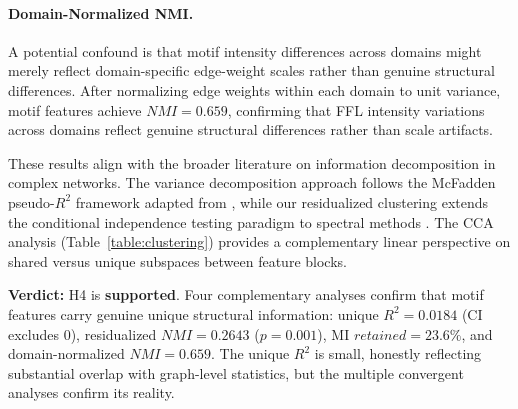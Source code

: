 \paragraph{Domain-Normalized NMI.}
A potential confound is that motif intensity differences across domains might merely reflect domain-specific edge-weight scales rather than genuine structural differences. After normalizing edge weights within each domain to unit variance, motif features achieve $NMI=0.659$, confirming that FFL intensity variations across domains reflect genuine structural differences rather than scale artifacts.

These results align with the broader literature on information decomposition in complex networks. The variance decomposition approach follows the McFadden pseudo-$R^2$ framework adapted from \citet{mcfadden1974conditional}, while our residualized clustering extends the conditional independence testing paradigm to spectral methods \cite{ng2002spectral}. The CCA analysis (Table~\ref{table:clustering}) provides a complementary linear perspective on shared versus unique subspaces between feature blocks.

\textbf{Verdict:} H4 is \textbf{supported}. Four complementary analyses confirm that motif features carry genuine unique structural information: unique $R^2=0.0184$ (CI excludes 0), residualized $NMI=0.2643$ ($p=0.001$), MI $retained=23.6\%$, and domain-normalized $NMI=0.659$. The unique $R^2$ is small, honestly reflecting substantial overlap with graph-level statistics, but the multiple convergent analyses confirm its reality.